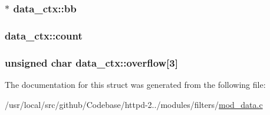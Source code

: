 \subsubsection[{\texorpdfstring{bb}{bb}}]{$\ast$ data\+\_\+ctx\+::bb}\hypertarget{structdata__ctx_a00ef0d55fca6a3e3145f68492f6d9ad6}{}\label{structdata__ctx_a00ef0d55fca6a3e3145f68492f6d9ad6}
\subsubsection[{\texorpdfstring{count}{count}}]{ data\+\_\+ctx\+::count}\hypertarget{structdata__ctx_ab31db25a982c93f8eb8d7538ccc29020}{}\label{structdata__ctx_ab31db25a982c93f8eb8d7538ccc29020}
\subsubsection[{\texorpdfstring{overflow}{overflow}}]{\setlength{\rightskip}{0pt plus 5cm}unsigned char data\+\_\+ctx\+::overflow\mbox{[}3\mbox{]}}\hypertarget{structdata__ctx_a61fe22719d2f6788e27738479a82dddc}{}\label{structdata__ctx_a61fe22719d2f6788e27738479a82dddc}


The documentation for this struct was generated from the following file\+:\begin{DoxyCompactItemize}
\item 
/usr/local/src/github/\+Codebase/httpd-\/2../modules/filters/\hyperlink{mod__data_8c}{mod\+\_\+data.\+c}\end{DoxyCompactItemize}
